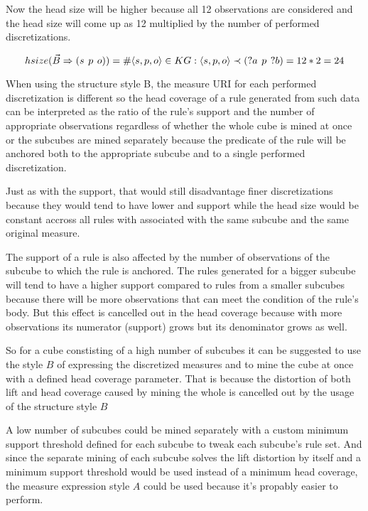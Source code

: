 Now the head size will be higher because all 12 observations are considered and the head size will come up as 12 multiplied by the number of performed discretizations.

$$
hsize(\vec{B} \Rightarrow (s\hspace{0.4em}p\hspace{0.4em}o)) = \# \langle s,p,o\rangle \in KG: \langle s,p,o\rangle \prec (?a\hspace{0.4em}p\hspace{0.4em}?b) = 12 * 2 = 24
$$

When using the structure style B, the measure URI for each performed discretization is different so the head coverage of a rule generated from such data can be interpreted as the ratio of the rule's support and the number of appropriate observations regardless of whether the whole cube is mined at once or the subcubes are mined separately because the predicate of the rule will be anchored both to the appropriate subcube and to a single performed discretization.

Just as with the support, that would still disadvantage finer discretizations because they would tend to have lower and support while the head size would be constant accross all rules with associated with the same subcube and the same original measure.

The support of a rule is also affected by the number of observations of the subcube to which the rule is anchored. The rules generated for a bigger subcube will tend to have a higher support compared to rules from a smaller subcubes because there will be more observations that can meet the condition of the rule's body. But this effect is cancelled out in the head coverage because with more observations its numerator (support) grows but its denominator grows as well. 

So for a cube constisting of a high number of subcubes it can be suggested to use the style $B$ of expressing the discretized measures and to mine the cube at once with a defined head coverage parameter. That is because the distortion of both lift and head coverage caused by mining the whole is cancelled out by the usage of the structure style $B$

A low number of subcubes could be mined separately with a custom minimum support threshold defined for each subcube to tweak each subcube's rule set. And since the separate mining of each subcube solves the lift distortion by itself and a minimum support threshold would be used instead of a minimum head coverage, the measure expression style $A$ could be used because it's propably easier to perform.

